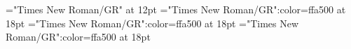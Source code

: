 \documentclass[a4paper]{article}
\begin{document}
\pagestyle{plain}
\sloppy
\setlength{\parfillskip}{0pt plus 1fil}
\font\div="Times New Roman/GR" at 12pt
\font{}="Times New Roman/GR":color=ffa500 at 18pt
\font\entryletHeaddiv="Times New Roman/GR":color=ffa500 at 18pt
\font{}="Times New Roman/GR":color=ffa500 at 18pt

\mbox{} 
\newpage 
\newpage 
\setcounter{page}{1} 
\pagestyle{fancy} 


\end{document}
